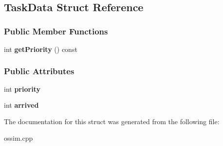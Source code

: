\hypertarget{struct_task_data}{}\subsection{Task\+Data Struct Reference}
\label{struct_task_data}
\subsubsection*{Public Member Functions}
\begin{DoxyCompactItemize}
\item 
int {\bfseries get\+Priority} () const \hypertarget{struct_task_data_a58cbe6eec8a86be7b827561a2f4b49c1}{}\label{struct_task_data_a58cbe6eec8a86be7b827561a2f4b49c1}

\end{DoxyCompactItemize}
\subsubsection*{Public Attributes}
\begin{DoxyCompactItemize}
\item 
int {\bfseries priority}\hypertarget{struct_task_data_a9d8b606897eb428a62d816b71312e1b7}{}\label{struct_task_data_a9d8b606897eb428a62d816b71312e1b7}

\item 
int {\bfseries arrived}\hypertarget{struct_task_data_a126fafee3369b6a2d8734f4e46c670bc}{}\label{struct_task_data_a126fafee3369b6a2d8734f4e46c670bc}

\end{DoxyCompactItemize}


The documentation for this struct was generated from the following file\+:\begin{DoxyCompactItemize}
\item 
ossim.\+cpp\end{DoxyCompactItemize}
